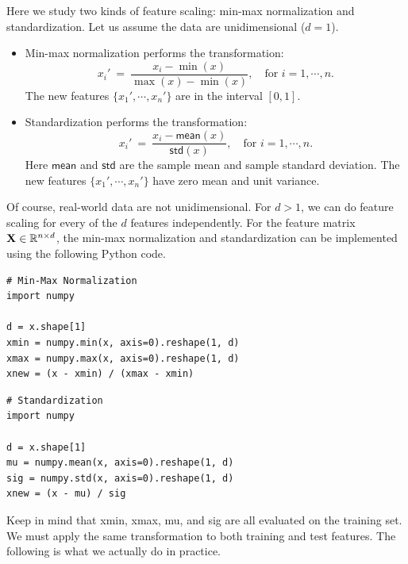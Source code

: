 \documentclass[11pt]{article}
\numberwithin{equation}{section}
\def\X{{\bf X}}
\def\RB{{\mathbb R}}
\def\mean{\mathsf{mean}}
\def\std{\mathsf{std}}
\begin{document}
Here we study two kinds of feature scaling: min-max normalization and standardization.
Let us assume the data are unidimensional ($d=1$).
\begin{itemize}
	\item 
	Min-max normalization performs the transformation:
	\begin{equation*}
	x_i' \: = \: \frac{ x_i - \min (x) }{ \max (x) - \min (x) },
	\quad \textrm{for } i = 1 , \cdots , n.
	\end{equation*}
	The new features $\{ x_1', \cdots , x_n' \}$ are in the interval $[0, 1]$.
	\item 
	Standardization performs the transformation:
	\begin{equation*}
	x_i' \: = \: \frac{ x_i - \mean (x) }{ \std (x) },
	\quad \textrm{for } i = 1 , \cdots , n.
	\end{equation*}
	Here $\mean $ and $\std $ are the sample mean and sample standard deviation.
	The new features $\{ x_1', \cdots , x_n' \}$ have zero mean and unit variance.
\end{itemize}
Of course, real-world data are not unidimensional.
For $d > 1$, we can do feature scaling for every of the $d$ features independently.
For the feature matrix $\X \in \RB^{n\times d}$, the min-max normalization and standardization can be implemented using the following Python code.

\vspace{3mm}
\begin{lstlisting}
# Min-Max Normalization
import numpy

d = x.shape[1]
xmin = numpy.min(x, axis=0).reshape(1, d)
xmax = numpy.max(x, axis=0).reshape(1, d)
xnew = (x - xmin) / (xmax - xmin)
\end{lstlisting}
\vspace{3mm}

\vspace{3mm}
\begin{lstlisting}
# Standardization
import numpy

d = x.shape[1]
mu = numpy.mean(x, axis=0).reshape(1, d)
sig = numpy.std(x, axis=0).reshape(1, d)
xnew = (x - mu) / sig
\end{lstlisting}
\vspace{3mm}


Keep in mind that \textsf{xmin}, \textsf{xmax}, \textsf{mu}, and \textsf{sig} are all evaluated on the training set.
We must apply the same transformation to both training and test features.
The following is what we actually do in practice.
\end{document}
